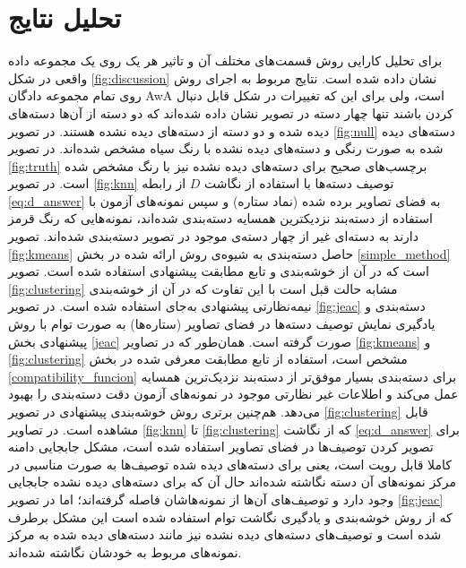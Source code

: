 \section{تحلیل نتایج}\label{exp:discussion}
برای تحلیل کارایی روش قسمت‌های مختلف آن و تاثیر هر یک  روی یک مجموعه داده واقعی در شکل
\ref{fig:discussion}
 نشان داده شده است. نتایج مربوط به اجرای روش روی تمام مجموعه دادگان AwA است، ولی برای این که تغییرات در شکل قابل دنبال کردن باشند تنها چهار دسته در  تصویر نشان داده شده‌اند که دو دسته از آن‌ها دسته‌های دیده شده و دو دسته از دسته‌های دیده نشده هستند. در تصویر
\ref{fig:null}
دسته‌های دیده شده به صورت رنگی و دسته‌های دیده نشده با رنگ سیاه مشخص شده‌اند. در تصویر
\ref{fig:truth}
برچسب‌های صحیح برای دسته‌های دیده نشده نیز با رنگ مشخص شده است. در تصویر
\ref{fig:knn}
توصیف دسته‌ها با استفاده از نگاشت $D$ از رابطه \eqref{eq:d_answer} به فضای تصاویر برده شده (نماد ستاره) و سپس نمونه‌های آزمون با استفاده از دسته‌بند نزدیکترین همسایه دسته‌بندی شده‌اند، نمونه‌هایی که رنگ قرمز دارند به دسته‌ای غیر از چهار دسته‌ی موجود در تصویر دسته‌بندی شده‌اند. تصویر 
\ref{fig:kmeans}
حاصل دسته‌بندی به شیوه‌ی روش ارائه شده در بخش \ref{simple_method} است که در آن از خوشه‌بندی  و تابع مطابقت پیشنهادی استفاده شده است. تصویر
\ref{fig:clustering}
مشابه حالت قبل است با این تفاوت که در آن از خوشه‌بندی نیمه‌نظارتی پیشنهادی به‌جای  استفاده شده است. در تصویر
\ref{fig:jeac}
دسته‌بندی و یادگیری نمایش توصیف دسته‌ها در فضای تصاویر (ستاره‌ها) به صورت توام با روش پیشنهادی بخش \ref{jeac} صورت گرفته است.
همان‌طور که در تصاویر
\ref{fig:kmeans} و \ref{fig:clustering}
مشخص است، استفاده از  تابع مطابقت معرفی شده در بخش \ref{compatibility_funcion} برای دسته‌بندی بسیار موفق‌تر از دسته‌بند نزدیک‌ترین همسایه عمل می‌کند و اطلاعات غیر نظارتی موجود در نمونه‌های آزمون دقت  دسته‌بندی را بهبود می‌دهد. هم‌چنین برتری روش خوشه‌بندی پیشنهادی در تصویر \ref{fig:clustering} قابل مشاهده است. در تصاویر \ref{fig:knn} تا \ref{fig:clustering} که از نگاشت  \eqref{eq:d_answer} برای تصویر کردن توصیف‌ها در فضای تصاویر استفاده شده است، مشکل جابجایی دامنه کاملا قابل رویت است، یعنی برای دسته‌های دیده شده توصیف‌ها به صورت مناسبی در مرکز نمونه‌های آن دسته نگاشته شده‌اند حال آن که برای دسته‌های دیده نشده جابجایی وجود دارد و توصیف‌های آن‌ها از نمونه‌هاشان فاصله گرفته‌اند؛ اما در تصویر
\ref{fig:jeac}
که از روش خوشه‌بندی و یادگیری نگاشت توام استفاده شده است این مشکل برطرف شده است و توصیف‌های دسته‌های دیده نشده نیز مانند دسته‌های دیده شده به مرکز نمونه‌های مربوط به خودشان نگاشته شده‌اند.

